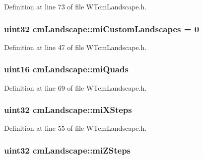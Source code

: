 Definition at line 73 of file WTcmLandscape.h.

\hypertarget{classcm_landscape_a76f88fec0fc083241762102d265a7dfc}{
\subsubsection[{miCustomLandscapes}]{\setlength{\rightskip}{0pt plus 5cm}uint32 {\bf cmLandscape::miCustomLandscapes} = 0}}
\label{classcm_landscape_a76f88fec0fc083241762102d265a7dfc}


Definition at line 47 of file WTcmLandscape.h.

\hypertarget{classcm_landscape_a2851b72bc9a1f1b70945f3799ecf80a0}{
\subsubsection[{miQuads}]{\setlength{\rightskip}{0pt plus 5cm}uint16 {\bf cmLandscape::miQuads}}}
\label{classcm_landscape_a2851b72bc9a1f1b70945f3799ecf80a0}


Definition at line 69 of file WTcmLandscape.h.

\hypertarget{classcm_landscape_ab66f6a730a24ea8682cbe916eb2ca33a}{
\subsubsection[{miXSteps}]{\setlength{\rightskip}{0pt plus 5cm}uint32 {\bf cmLandscape::miXSteps}}}
\label{classcm_landscape_ab66f6a730a24ea8682cbe916eb2ca33a}


Definition at line 55 of file WTcmLandscape.h.

\hypertarget{classcm_landscape_a1e54f8fe6b5cd944870ddc3e86ded434}{
\subsubsection[{miZSteps}]{\setlength{\rightskip}{0pt plus 5cm}uint32 {\bf cmLandscape::miZSteps}}}
\label{classcm_landscape_a1e54f8fe6b5cd944870ddc3e86ded434}



